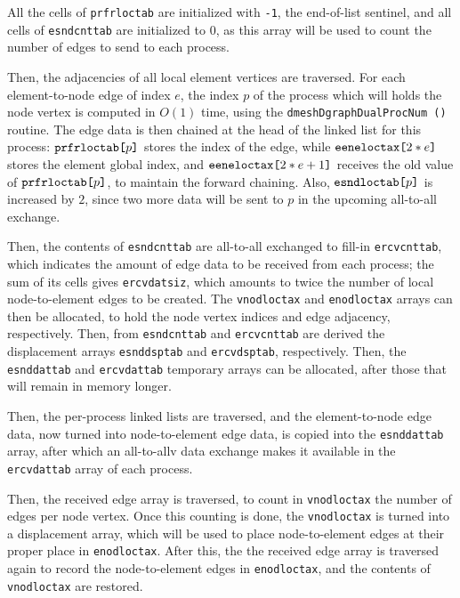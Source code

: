All the cells of \texttt{prfr\lbt loc\lbt tab} are initialized with
\texttt{-1}, the end-of-list sentinel, and all cells of
\texttt{esnd\lbt cnt\lbt tab} are initialized to $0$, as this array
will be used to count the number of edges to send to each process.

Then, the adjacencies of all local element vertices are traversed. For
each element-to-node edge of index $e$, the index $p$ of the process
which will holds the node vertex is computed in $O(1)$ time, using the
\texttt{dmesh\lbo Dgraph\lbt Dual\lbt Proc\lbo Num\,()} routine.
The edge data is then chained at the head of the linked list for this
process: $\texttt{prfr\lbt loc\lbt tab[}p\texttt{]}$ stores the index
of the edge, while $\texttt{eene\lbt loc\lbt tax[}2 * e\texttt{]}$
stores the element global index, and $\texttt{eene\lbt loc\lbt tax[}2
* e + 1 \texttt{]}$ receives the old value of
$\texttt{prfr\lbt loc\lbt tab[}p\texttt{]}$, to maintain the forward
chaining. Also, $\texttt{esnd\lbt loc\lbt tab[}p\texttt{]}$ is
increased by $2$, since two more data will be sent to $p$ in the
upcoming all-to-all exchange.

Then, the contents of \texttt{esnd\lbt cnt\lbt tab} are all-to-all
exchanged to fill-in \texttt{ercv\lbt cnt\lbt tab}, which indicates
the amount of edge data to be received from each process; the sum of
its cells gives \texttt{ercv\lbt dat\lbt siz}, which amounts to twice
the number of local node-to-element edges to be created. The
\texttt{vnod\lbt loc\lbt tax} and \texttt{enod\lbt loc\lbt tax} arrays
can then be allocated, to hold the node vertex indices and edge
adjacency, respectively. Then, from \texttt{esnd\lbt cnt\lbt tab} and
\texttt{ercv\lbt cnt\lbt tab} are derived the displacement arrays
\texttt{esnd\lbt dsp\lbt tab} and
\texttt{ercv\lbt dsp\lbt tab}, respectively. Then, the
\texttt{esnd\lbt dat\lbt tab} and
\texttt{ercv\lbt dat\lbt tab} temporary arrays can be allocated,
after those that will remain in memory longer.

Then, the per-process linked lists are traversed, and the
element-to-node edge data, now turned into node-to-element edge data,
is copied into the \texttt{esnd\lbt dat\lbt tab} array, after which an
all-to-allv data exchange makes it available in the
\texttt{ercv\lbt dat\lbt tab} array of each process.

Then, the received edge array is traversed, to count in
\texttt{vnod\lbt loc\lbt tax} the number of edges per node
vertex. Once this counting is done, the
\texttt{vnod\lbt loc\lbt tax} is turned into a displacement array,
which will be used to place node-to-element edges at their proper
place in \texttt{enod\lbt loc\lbt tax}. After this, the the received
edge array is traversed again to record the node-to-element edges in
\texttt{enod\lbt loc\lbt tax}, and the contents of
\texttt{vnod\lbt loc\lbt tax} are restored.

